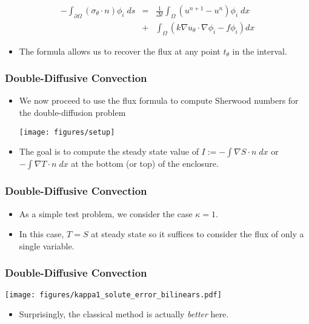 \documentclass[
  compress
  ,12pt
]{beamer}
\begin{document}
\begin{frame}[t]
  {
  \begin{eqnarray}
    \nonumber
    -\int_{\partial \Omega} \left( \sigma_{\theta} \cdot n\right) \phi_i \;ds &=&
    \frac{1}{\Delta t}\int_{\Omega} \left(u^{n+1} - u^n\right) \phi_i \;dx
    \\
    \nonumber
    &+&
    \int_{\Omega} \left(k \nabla u_{\theta} \cdot \nabla \phi_i -f\phi_i \right)dx 
  \end{eqnarray}

  \begin{itemize}
    \item {The formula allows us to recover the flux at any point $t_{\theta}$ in the interval.}
  \end{itemize}
  }
\end{frame}



\begin{frame}
  \frametitle{Double-Diffusive Convection}
  \begin{itemize}
    \item{ We now proceed to use the flux formula to
      compute Sherwood numbers for the double-diffusion problem
      \vspace{-.2in}
      \begin{center}
	\texttt{[image: figures/setup]}
      \end{center}
    }
    \item{The goal is to compute the steady state value of 
      $I := -\int\nabla S \cdot n \;dx$ or $-\int\nabla T \cdot n \;dx$
      at the bottom (or top) of the enclosure.}
  \end{itemize}
\end{frame}



\begin{frame}
  \frametitle{Double-Diffusive Convection}
  \begin{itemize}
    \item{As a simple test problem, we consider the case $\kappa=1$.}
    \item{In this case, $T=S$ at steady state so it suffices to consider
      the flux of only a single variable. }
  \end{itemize}
\end{frame}

\begin{frame}
  \frametitle{Double-Diffusive Convection}
    \vspace{-.25in}
    \begin{center}
	\texttt{[image: figures/kappa1\_solute\_error\_bilinears.pdf]}    
  \end{center}
    \vspace{-.2in}
    \begin{itemize}
      \item{Surprisingly, the classical method is actually \emph{better} here.}
    \end{itemize}
\end{frame}
\end{document}
